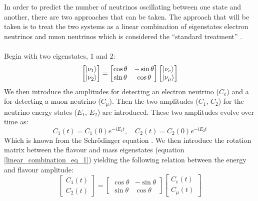 In order to predict the number of neutrinos oscillating between one state and another, there are two approaches that can be taken. The approach that will be taken is to treat the two systems as a linear combination of eigenstates electron neutrinos and muon neutrinos which is considered the ``standard treatment'' \cite{sassaroli1999neutrino}  \cite{griffiths2008neutrinoOscillations}.
\\\\Begin with two eigenstates, 1 and 2: 
\begin{equation}
    \begin{bmatrix}
        \ket{\nu_1} \\
        \ket{\nu_2}
    \end{bmatrix}
    =
    \begin{bmatrix}
        \cos\theta & -\sin\theta \\
        \sin\theta & \cos\theta 
    \end{bmatrix}
        \begin{bmatrix}
        \ket{\nu_e} \\
        \ket{\nu_\mu}
    \end{bmatrix}
    \label{linear_combination_eq_1}
\end{equation}
We then introduce the amplitudes for detecting an electron neutrino ($C_e$) and a for detecting a muon neutrino ($C_\mu$). Then the two amplitudes ($C_1$, $C_2$) for the neutrino energy states ($E_1$, $E_2$) are introduced. These two amplitudes evolve over time as:
\begin{equation}
    C_1(t) = C_1(0)e^{-iE_1t}, \quad  C_2(t) = C_2(0)e^{-iE_2t}
    \label{linear_combination_eq_1.5}
\end{equation}
Which is known from the Schrödinger equation \cite{sassaroli1999neutrino} \cite{griffiths2008neutrinoOscillations}. We then introduce the rotation matrix between the flavour and mass eigenstates (equation \ref{linear_combination_eq_1}) yielding the following relation between the energy and flavour amplitude:
\begin{equation}
    \begin{bmatrix}
        C_1(t) \\
        C_2(t)
    \end{bmatrix}
    =
    \begin{bmatrix}
        \cos\theta & -\sin\theta \\
        \sin\theta & \cos\theta 
    \end{bmatrix}
        \begin{bmatrix}
        C_e(t) \\
        C_\mu(t)
    \end{bmatrix}
    \label{linear_combination_eq_2}
\end{equation}
